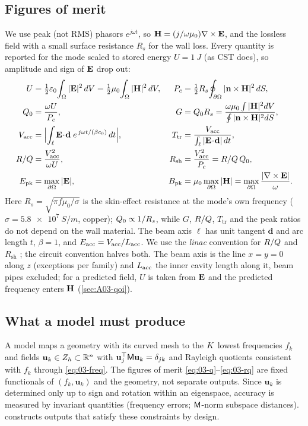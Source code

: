 \subsection{Figures of merit}\label{sec:03-qoi}
We use peak (not RMS) phasors $e^{j\omega t}$, so $\mathbf{H}=(j/\omega\mu_0)\nabla\times\mathbf{E}$, and the lossless field with a small surface resistance $R_s$ for the
wall loss. Every quantity is reported for the mode scaled to stored energy $U=\SI{1}{J}$ (as CST does), so amplitude and sign of $\mathbf{E}$ drop out:
\begin{align}
  U&=\tfrac12\varepsilon_0\!\int_\Omega|\E|^2\,dV=\tfrac12\mu_0\!\int_\Omega|\Hf|^2\,dV, &
  P_c&=\tfrac12R_s\!\oint_{\bdry}|\mathbf n\times\Hf|^2\,dS, \notag\\
  \Qz&=\frac{\omega U}{P_c}, &
  G&=\Qz R_s=\frac{\omega\mu_0\int|\Hf|^2dV}{\oint|\mathbf n\times\Hf|^2dS}, \label{eq:03-q}\\
  V_{\mathrm{acc}}&=\Bigl|\int_\ell \E\!\cdot\!\mathbf d\;e^{\,j\omega t/(\beta c_0)}\,dt\Bigr|, &
  T_{\mathrm{tr}}&=\frac{V_{\mathrm{acc}}}{\int_\ell|\E\!\cdot\!\mathbf d|\,dt}, \notag\\
  \RoQ&=\frac{V_{\mathrm{acc}}^2}{\omega U}, &
  R_{\mathrm{sh}}&=\frac{V_{\mathrm{acc}}^2}{P_c}=\RoQ\,\Qz, \label{eq:03-rq}\\
  \Epk&=\max_{\bdry}|\E|, &
  \Bpk&=\mu_0\max_{\bdry}|\Hf|=\max_{\bdry}\frac{|\curl\E|}{\omega}. \notag
\end{align}
Here $R_s=\sqrt{\pi f\mu_0/\sigma}$ is the skin-effect resistance at the mode's own frequency ($\sigma=\SI{5.8e7}{S/m}$, copper); $\Qz\propto1/R_s$, while $G$, $R/Q$, $T_{\mathrm{tr}}$
and the peak ratios do not depend on the wall material. The beam axis $\ell$ has unit tangent $\mathbf d$ and arc length $t$, $\beta=1$, and $\Eacc=V_{\mathrm{acc}}/\Lacc$. %
We use the \emph{linac} convention for $R/Q$ and $R_{\mathrm{sh}}$ \citep{wangler2008rf,padamsee2008rf}; the circuit convention halves both. %
The beam axis is the line $x=y=0$ along $z$ (exceptions per family) and $\Lacc$ the inner cavity length along it, beam pipes excluded; for a predicted field, $U$ is taken from $\mathbf{E}$ and the predicted frequency enters $\mathbf{H}$ (\cref{sec:A03-qoi}). %

\subsection{What a model must produce}\label{sec:03-targets}
A model maps a geometry with its curved mesh to the $K$ lowest frequencies $f_k$ and fields $\mathbf u_k\in Z_h\subset\mathbb{R}^{n}$ with $\mathbf u_j^\top\mathsf{M}\mathbf u_k=\delta_{jk}$ and
Rayleigh quotients consistent with $f_k$ through \eqref{eq:03-freq}. The figures of merit \eqref{eq:03-q}--\eqref{eq:03-rq} are fixed functionals of $(f_k,\mathbf u_k)$ and the geometry, not separate outputs.
Since $\mathbf u_k$ is determined only up to sign and rotation within an eigenspace, accuracy is measured by invariant quantities (frequency errors; $\mathsf{M}$-norm subspace distances).
 constructs outputs that satisfy these constraints by design.
